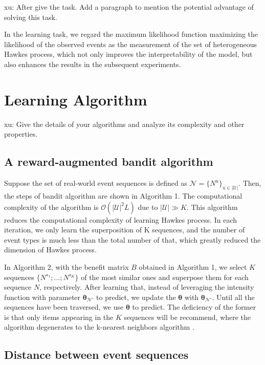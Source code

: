 \documentclass[runningheads]{llncs}
\newcommand{\xu}[1]{{\color{red} xu: #1}}
\begin{document}
\xu{After give the task. Add a paragraph to mention the potential advantage  of solving this task.}


In the learning task, we regard the maximum likelihood function maximizing the likelihood of the observed events as the measurement of the set of heterogeneous Hawkes process, which not only improves the interpretability of the model, but also enhances the results in the subsequent experiments.



\section{Learning Algorithm}
\xu{Give the details of your algorithms and analyze its complexity and other properties.}

\subsection{A reward-augmented bandit algorithm}

Suppose the set of real-world event sequences is defined as $\mathcal{N} = \{N^u\}_{u \in |\mathcal{U}|}$. Then, the steps of bandit algorithm are shown in Algorithm 1. The computational complexity of the algorithm is $\mathcal{O}(|\mathcal{U}|^2 L)$ due to $|\mathcal{U}| \gg K$. This algorithm reduces the computational complexity of learning Hawkes process. In each iteration, we only learn the superposition of K sequences, and the number of event types is much less than the total number of that, which greatly reduced the dimension of Hawkes process.

In Algorithm 2, with the benefit matrix $B$ obtained in Algorithm 1, we select $K$ sequences $\{N^{s_1};\ldots;N^{s_K}\}$ of the most similar ones and superpose them for each sequence $N$, respectively. After learning that, instead of leveraging the intensity function with parameter $\bm{\theta}_{\mathcal{N}'}$ to predict, we update the $\bm{\theta}$ with  $\bm{\theta}_{\mathcal{N}'}$. Until all the sequences have been traversed, we use $\bm{\theta}$ to predict. The deficiency of the former is that only items appearing in the $K$ sequences will be recommend, where the algorithm degenerates to the k-nearest neighbors algorithm \cite{fix1985discriminatory}.


\subsection{Distance between event sequences}
\end{document}
